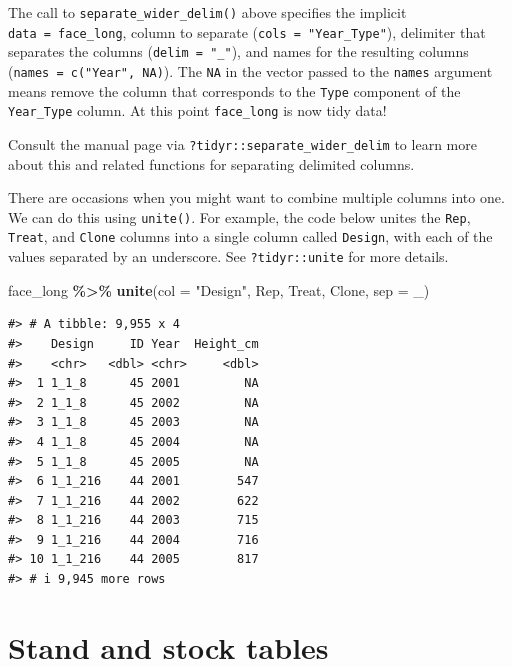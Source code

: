 \documentclass[
  11pt,
]{krantz}
\newenvironment{Shaded}{\begin{snugshade}}{\end{snugshade}}
\newcommand{\DataTypeTok}[1]{\textcolor[rgb]{0.13,0.29,0.53}{#1}}
\newcommand{\KeywordTok}[1]{\textcolor[rgb]{0.13,0.29,0.53}{\textbf{#1}}}
\newcommand{\NormalTok}[1]{#1}
\newcommand{\OperatorTok}[1]{\textcolor[rgb]{0.81,0.36,0.00}{\textbf{#1}}}
\newcommand{\StringTok}[1]{\textcolor[rgb]{0.31,0.60,0.02}{#1}}
\theoremstyle{definition}
\theoremstyle{definition}
\theoremstyle{definition}
\theoremstyle{definition}
\theoremstyle{remark}
\begin{document}
The call to \texttt{separate\_wider\_delim()} above specifies the implicit \texttt{data\ =\ face\_long}, column to separate (\texttt{cols\ =\ "Year\_Type"}), delimiter that separates the columns (\texttt{delim\ =\ "\_"}), and names for the resulting columns (\texttt{names\ =\ c("Year",\ NA)}). The \texttt{NA} in the vector passed to the \texttt{names} argument means remove the column that corresponds to the \texttt{Type} component of the \texttt{Year\_Type} column. At this point \texttt{face\_long} is now tidy data!

Consult the manual page via \texttt{?tidyr::separate\_wider\_delim} to learn more about this and related functions for separating delimited columns.

There are occasions when you might want to combine multiple columns into one. We can do this using \texttt{unite()}. For example, the code below unites the \texttt{Rep}, \texttt{Treat}, and \texttt{Clone} columns into a single column called \texttt{Design}, with each of the values separated by an underscore. See \texttt{?tidyr::unite} for more details.

\begin{Shaded}
\begin{Highlighting}[]
\NormalTok{face\_long }\OperatorTok{\%\textgreater{}\%}\StringTok{ }\KeywordTok{unite}\NormalTok{(}\DataTypeTok{col =} \StringTok{"Design"}\NormalTok{, Rep, Treat, Clone, }\DataTypeTok{sep =} \StringTok{\textquotesingle{}\_\textquotesingle{}}\NormalTok{)}
\end{Highlighting}
\end{Shaded}

\begin{verbatim}
#> # A tibble: 9,955 x 4
#>    Design     ID Year  Height_cm
#>    <chr>   <dbl> <chr>     <dbl>
#>  1 1_1_8      45 2001         NA
#>  2 1_1_8      45 2002         NA
#>  3 1_1_8      45 2003         NA
#>  4 1_1_8      45 2004         NA
#>  5 1_1_8      45 2005         NA
#>  6 1_1_216    44 2001        547
#>  7 1_1_216    44 2002        622
#>  8 1_1_216    44 2003        715
#>  9 1_1_216    44 2004        716
#> 10 1_1_216    44 2005        817
#> # i 9,945 more rows
\end{verbatim}

\hypertarget{standStockTabs}{%
\section{Stand and stock tables}\label{standStockTabs}}
\end{document}
